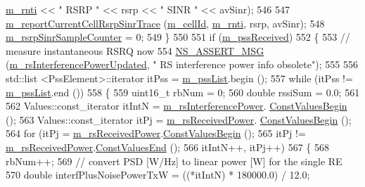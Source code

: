 \begin{DoxyCode}
      \hyperlink{classns3_1_1LteUePhy_a887b5dc4e246a308cd09127b64ed8fac}{m\_rnti} << \textcolor{stringliteral}{" RSRP "} << rsrp << \textcolor{stringliteral}{" SINR "} << avSinr);
546 
547       \hyperlink{classns3_1_1LteUePhy_aded24128cc664f9a3ef6e70d3c3fc430}{m\_reportCurrentCellRsrpSinrTrace} (\hyperlink{classns3_1_1LtePhy_ac53d10d27f1bde64807a3ff366662787}{m\_cellId}, 
      \hyperlink{classns3_1_1LteUePhy_a887b5dc4e246a308cd09127b64ed8fac}{m\_rnti}, rsrp, avSinr);
548       \hyperlink{classns3_1_1LteUePhy_a1b0a01c9da8427095d325cc12b0cdccb}{m\_rsrpSinrSampleCounter} = 0;
549     \}
550 
551   \textcolor{keywordflow}{if} (\hyperlink{classns3_1_1LteUePhy_a5ab022b1bccbff633af1f2189b68305a}{m\_pssReceived})
552     \{
553       \textcolor{comment}{// measure instantaneous RSRQ now}
554       \hyperlink{assert_8h_aff5ece9066c74e681e74999856f08539}{NS\_ASSERT\_MSG} (\hyperlink{classns3_1_1LteUePhy_a4ab51d98c08937a722e722ec81ba0f58}{m\_rsInterferencePowerUpdated}, \textcolor{stringliteral}{" RS
       interference power info obsolete"});
555 
556       std::list <PssElement>::iterator itPss = \hyperlink{classns3_1_1LteUePhy_a65bf8a30d9bdcfbe5f8e2faac4007406}{m\_pssList}.begin ();
557       \textcolor{keywordflow}{while} (itPss != \hyperlink{classns3_1_1LteUePhy_a65bf8a30d9bdcfbe5f8e2faac4007406}{m\_pssList}.end ())
558         \{
559           uint16\_t rbNum = 0;
560           \textcolor{keywordtype}{double} rssiSum = 0.0;
561 
562           Values::const\_iterator itIntN = \hyperlink{classns3_1_1LteUePhy_a92beda3e8ae6ee294e38365264fdd81d}{m\_rsInterferencePower}.
      \hyperlink{classns3_1_1SpectrumValue_aad6900431bd0554b3ba9a00691c2393b}{ConstValuesBegin} ();
563           Values::const\_iterator itPj = \hyperlink{classns3_1_1LteUePhy_a6ed253b11e81be61b177836490e4d07b}{m\_rsReceivedPower}.
      \hyperlink{classns3_1_1SpectrumValue_aad6900431bd0554b3ba9a00691c2393b}{ConstValuesBegin} ();
564           \textcolor{keywordflow}{for} (itPj = \hyperlink{classns3_1_1LteUePhy_a6ed253b11e81be61b177836490e4d07b}{m\_rsReceivedPower}.\hyperlink{classns3_1_1SpectrumValue_aad6900431bd0554b3ba9a00691c2393b}{ConstValuesBegin} ();
565                itPj != \hyperlink{classns3_1_1LteUePhy_a6ed253b11e81be61b177836490e4d07b}{m\_rsReceivedPower}.\hyperlink{classns3_1_1SpectrumValue_ab5c2fbde4e06be7c0e4d7a0755c607be}{ConstValuesEnd} ();
566                itIntN++, itPj++)
567             \{
568               rbNum++;
569               \textcolor{comment}{// convert PSD [W/Hz] to linear power [W] for the single RE}
570               \textcolor{keywordtype}{double} interfPlusNoisePowerTxW = ((*itIntN) * 180000.0) / 12.0;

\end{DoxyCode}
